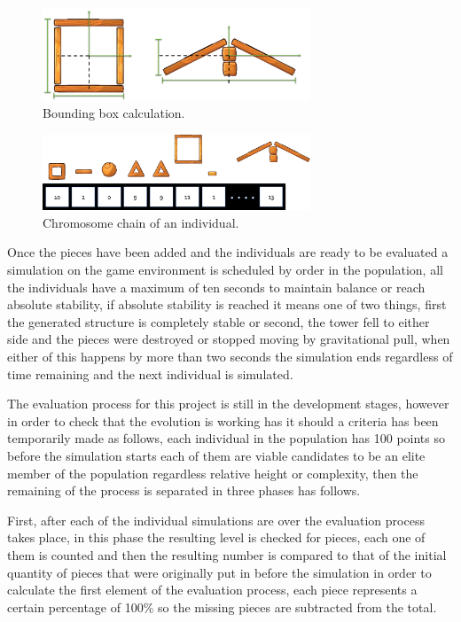 \documentclass[conference]{IEEEtran}
\begin{document}
    \begin{figure}[htbp]
    \centerline{\includegraphics[width=80mm]{Images/bounding_box_calculation.png}}
    \caption{Bounding box calculation.}
    \label{bounding_boc_calc}
    \end{figure}
    
    \begin{figure}[htbp]
    \centerline{\includegraphics[width=80mm]{Images/chromosome_chain_example.png}}
    \caption{Chromosome chain of an individual.}
    \label{old_chrom}
    \end{figure}
    
    Once the pieces have been added and the individuals are ready to be evaluated a
    simulation on the game environment is scheduled by order in the population, all
    the individuals have a maximum of ten seconds to maintain balance or reach
    absolute stability, if absolute stability is reached it means one of two things,
    first the generated structure is completely stable or second, the tower fell to
    either side and the pieces were destroyed or stopped moving by gravitational
    pull, when either of this happens by more than two seconds the simulation ends
    regardless of time remaining and the next individual is simulated.
    
    The evaluation process for this project is still in the development stages,
    however in order to check that the evolution is working has it should a criteria
    has been temporarily made as follows, each individual in the population has 100
    points so before the simulation starts each of them are viable candidates to be
    an elite member of the population regardless relative height or complexity, then
    the remaining of the process is separated in three phases has follows.
    
    First, after each of the individual simulations are over the evaluation process
    takes place, in this phase the resulting level is checked for pieces, each one
    of them is counted and then the resulting number is compared to that of the
    initial quantity of pieces that were originally put in before the simulation in
    order to calculate the first element of the evaluation process, each piece
    represents a certain percentage of 100\% so the missing pieces are subtracted
    from the total.
    
\end{document}
